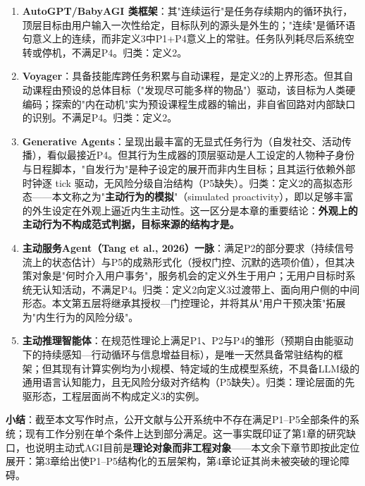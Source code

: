 \documentclass[11pt,a4paper]{ctexart}
\begin{document}
\begin{enumerate}

  \item \textbf{AutoGPT/BabyAGI 类框架}：其"连续运行"是任务存续期内的循环执行，顶层目标由用户输入一次性给定，目标队列的源头是外生的；"连续"是循环语句意义上的连续，而非定义3中P1+P4意义上的常驻。任务队列耗尽后系统空转或停机，不满足P4。归类：定义2。

  \item \textbf{Voyager}：具备技能库跨任务积累与自动课程，是定义2的上界形态。但其自动课程由预设的总体目标（"发现尽可能多样的物品"）驱动，该目标为人类硬编码；探索的"内在动机"实为预设课程生成器的输出，非自省回路对内部缺口的识别。不满足P4。归类：定义2。

  \item \textbf{Generative Agents}：呈现出最丰富的无显式任务行为（自发社交、活动传播），看似最接近P4。但其行为生成器的顶层驱动是人工设定的人物种子身份与日程脚本，"自发行为"是种子设定的展开而非内生目标；且其运行依赖外部时钟逐 tick 驱动，无风险分级自治结构（P5缺失）。归类：定义2的高拟态形态——本文称之为"\textbf{主动行为的模拟}"（simulated proactivity），即以足够丰富的外生设定在外观上逼近内生主动性。这一区分是本章的重要结论：\textbf{外观上的主动行为不构成范式判据，目标来源的结构才是。}

  \item \textbf{主动服务Agent（Tang et al., 2026）一脉}：满足P2的部分要求（持续信号流上的状态估计）与P5的成熟形式化（授权门控、沉默的选项价值），但其决策对象是"何时介入用户事务"，服务机会的定义外生于用户；无用户目标时系统无认知活动，不满足P4。归类：定义2向定义3过渡带上、面向用户侧的中间形态。本文第五层将继承其授权—门控理论，并将其从"用户干预决策"拓展为"内生行为的风险分级"。

  \item \textbf{主动推理智能体}：在规范性理论上满足P1、P2与P4的雏形（预期自由能驱动下的持续感知—行动循环与信息增益目标），是唯一天然具备常驻结构的框架；但其现有计算实例均为小规模、特定域的生成模型系统，不具备LLM级的通用语言认知能力，且无风险分级对齐结构（P5缺失）。归类：理论层面的先驱形态，工程层面尚不构成定义3的实例。

\end{enumerate}

\textbf{小结}：截至本文写作时点，公开文献与公开系统中不存在满足P1--P5全部条件的系统；现有工作分别在单个条件上达到部分满足。这一事实既印证了第1章的研究缺口，也说明主动式AGI目前是\textbf{理论对象而非工程对象}——本文余下章节即按此定位展开：第3章给出使P1--P5结构化的五层架构，第4章论证其尚未被突破的理论障碍。
\end{document}
